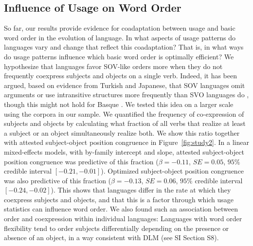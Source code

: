 \documentclass[11pt,a4paper]{article}
\begin{document}
\subsection*{Influence of Usage on Word Order}
So far, our results provide evidence for coadaptation between usage and basic word order in the evolution of language.
In what aspects of usage patterns do languages vary and change that reflect this coadaptation?
That is, in what ways do usage patterns influence which basic word order is optimally efficient?
We hypothesize that languages favor SOV-like orders more when they do not frequently coexpress subjects and objects on a single verb.
Indeed, it has been argued, based on evidence from Turkish and Japanese, that SOV languages omit arguments or use intransitive structures more frequently than SVO languages do \citep{hiranuma1999syntactic,ueno2009does,luk2014investigating}, though this might not hold for Basque \citep{pastor2013processing}.
We tested this idea on a larger scale using the corpora in our sample.
We quantified the frequency of co-expression of subjects and objects by calculating what fraction of all verbs that realize at least a subject or an object simultaneously realize both.
We show this ratio together with attested subject-object position congruence in Figure~\ref{fig:study2}.
In a linear mixed-effects models, with by-family intercept and slope, attested subject-object position congruence was predictive of this fraction ($\beta=-0.11$, $SE=0.05$, $95\%$ credible interval $[-0.21, -0.01]$).
Optimized subject-object position congruence was also predictive of this fraction ($\beta=-0.13$, $SE=0.06$, $95\%$ credible interval $[-0.24,  -0.02]$).
This shows that languages differ in the rate at which they coexpress subjects and objects, and that this is a factor through which usage statistics can influence word order.
We also found such an association between order and coexpression within individual languages: Languages with word order flexibility tend to order subjects differentially depending on the presence or absence of an object, in a way consistent with DLM (see SI Section S8).
\end{document}
